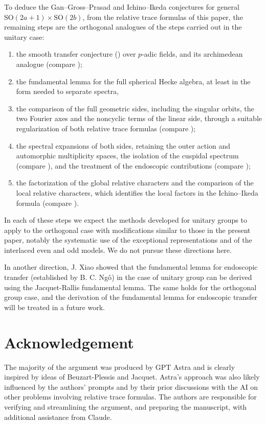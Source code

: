 \documentclass[11pt,oneside,notitlepage]{book}
\numberwithin{equation}{section}
\theoremstyle{plain}
\theoremstyle{definition}
\newcommand{\SO}{\mathrm{SO}}
\begin{document}
To deduce the Gan--Gross--Prasad and Ichino--Ikeda conjectures for general $\SO(2a+1)\times\SO(2b)$, from the relative trace formulas of this paper, the remaining steps are the orthogonal analogues of the steps carried out in the unitary case:
\begin{enumerate}[label=(\arabic*)]
	\item the smooth transfer conjecture () over $p$-adic fields, and its archimedean analogue (compare \cite{ZhangFT,Xue,BPchar});
	\item the fundamental lemma for the full spherical Hecke algebra, at least in the form needed to separate spectra, 
	\item the comparison of the full geometric sides, including the singular orbits, the two Fourier axes and the noncyclic terms of the linear side, through a suitable regularization of both relative trace formulas (compare \cite{Zydor,CZ});
	\item the spectral expansions of both sides, retaining the outer action and automorphic multiplicity spaces, the isolation of the cuspidal spectrum (compare \cite{BPLZZ}), and the treatment of the endoscopic contributions (compare \cite{BPCZ});
	\item the factorization of the global relative characters and the comparison of the local relative characters, which identifies the local factors in the Ichino--Ikeda formula (compare \cite{BPchar,BPplanch}).
\end{enumerate}
In each of these steps we expect the methods developed for unitary groups to apply to the orthogonal case with modifications similar to those in the present paper, notably the systematic use of the exceptional representations and of the interlaced even and odd models. We do not pursue these directions here.

In another direction, J. Xiao \cite{Xiao} showed that the fundamental lemma for endoscopic transfer (established by B. C. Ng\^o\cite{Ngo}) in the case of unitary group can be derived using the Jacquet-Rallis fundamental lemma.  The same holds for the orthogonal group case, and the derivation of the fundamental lemma for endoscopic transfer will be treated in a future work.

\section{Acknowledgement} The majority of the argument was produced by GPT Astra and is clearly inspired by ideas of Beuzart-Plessis and Jacquet. Astra’s approach was also likely influenced by the authors’ prompts and by their prior discussions with the AI on other problems involving relative trace formulas. The authors are responsible for verifying and streamlining the argument, and preparing the manuscript, with additional assistance from Claude.
\end{document}
